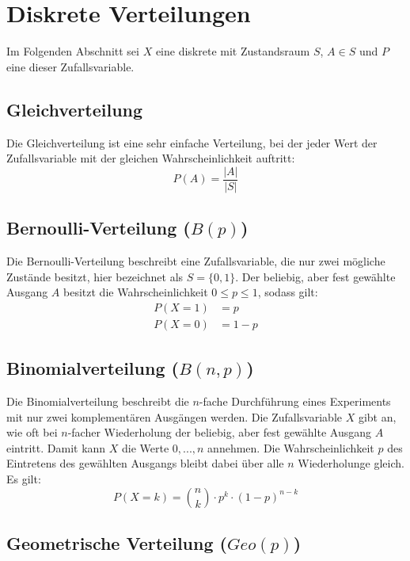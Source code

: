 \section{Diskrete Verteilungen}

Im Folgenden Abschnitt sei $X$ eine diskrete 
mit Zustandsraum $S$, $A \in S$ und $P$ eine
 dieser Zufallsvariable.


\subsection{Gleichverteilung}

Die Gleichverteilung ist eine sehr einfache Verteilung, bei der jeder Wert der
Zufallsvariable mit der gleichen Wahrscheinlichkeit auftritt:
\[
P(A) = \frac{|A|}{|S|}
\]

\subsection{Bernoulli-Verteilung ($B(p)$)}

Die Bernoulli-Verteilung beschreibt eine Zufallsvariable, die nur zwei mögliche
Zustände besitzt, hier bezeichnet als $S = \{0,1\}$. Der beliebig, aber fest
gewählte Ausgang $A$ besitzt die Wahrscheinlichkeit $0 \le p \le 1$, sodass
gilt:
\begin{align*}
P(X=1)&=p  \\
P(X=0)&=1-p
\end{align*}

\subsection{Binomialverteilung ($B(n,p)$)}

Die Binomialverteilung beschreibt die $n$-fache Durchführung eines Experiments
mit nur zwei komplementären Ausgängen werden. Die Zufallsvariable $X$ gibt an,
wie oft bei $n$-facher Wiederholung der beliebig, aber fest gewählte Ausgang $A$
eintritt. Damit kann $X$ die Werte $0, ..., n$ annehmen. Die Wahrscheinlichkeit
$p$ des Eintretens des gewählten Ausgangs bleibt dabei über alle $n$
Wiederholunge gleich. Es gilt:
\[
P(X=k) = \binom{n}{k}\cdot p^k\cdot(1-p)^{n-k}
\]

\subsection{Geometrische Verteilung ($Geo(p)$)}

